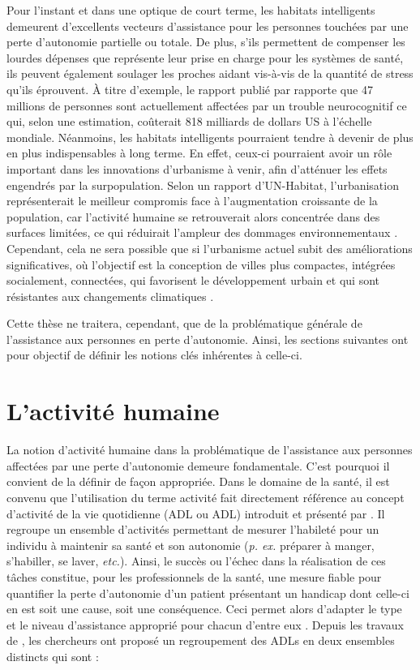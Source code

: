 Pour l’instant et dans une optique de court terme, les habitats intelligents demeurent d’excellents vecteurs d’assistance pour les personnes touchées par une perte d’autonomie partielle ou totale. De plus, s'ils permettent de compenser les lourdes dépenses que représente leur prise en charge pour les systèmes de santé, ils peuvent également soulager les proches aidant vis-à-vis de la quantité de stress qu’ils éprouvent. À titre d'exemple, le rapport publié par \cite{Prince2016} rapporte que 47 millions de personnes sont actuellement affectées par un trouble neurocognitif ce qui, selon une estimation, coûterait 818 milliards de dollars US à l'échelle mondiale. Néanmoins, les habitats intelligents pourraient tendre à devenir de plus en plus indispensables à long terme. En effet, ceux-ci pourraient avoir un rôle important dans les innovations d’urbanisme à venir, afin d’atténuer les effets engendrés par la surpopulation. Selon un rapport d’UN-Habitat, l’urbanisation représenterait le meilleur compromis face à l’augmentation croissante de la population, car l’activité humaine se retrouverait alors concentrée dans des surfaces limitées, ce qui réduirait l’ampleur des dommages environnementaux \citep{UNFPA2007}. Cependant, cela ne sera possible que si l’urbanisme actuel subit des améliorations significatives, où l’objectif est la conception de villes plus compactes, intégrées socialement, connectées, qui favorisent le développement urbain et qui sont résistantes aux changements climatiques \citep{UNFPA2007}.

Cette thèse ne traitera, cependant, que de la problématique générale de l'assistance aux personnes en perte d'autonomie. Ainsi, les sections suivantes ont pour objectif de définir les notions clés inhérentes à celle-ci.

\section{L'activité humaine}

La notion d'activité humaine dans la problématique de l'assistance aux personnes affectées par une perte d'autonomie demeure fondamentale. C'est pourquoi il convient de la définir de façon appropriée. Dans le domaine de la santé, il est convenu que l'utilisation du terme activité fait directement référence au concept d'activité de la vie quotidienne (\acl{ADL} ou \acs{ADL}) introduit et présenté par \cite{Katz1963}. Il regroupe un ensemble d'activités permettant de mesurer l'habileté pour un individu à maintenir sa santé et son autonomie (\textit{p. ex.} préparer à manger, s'habiller, se laver, \textit{etc.}). Ainsi, le succès ou l'échec dans la réalisation de ces tâches constitue, pour les professionnels de la santé, une mesure fiable pour quantifier la perte d'autonomie d'un patient présentant un handicap dont celle-ci en est soit une cause, soit une conséquence. Ceci permet alors d'adapter le type et le niveau d'assistance approprié pour chacun d'entre eux \citep{Giovannetti2002}. Depuis les travaux de \cite{Katz1963}, les chercheurs \cite{Lawton1969} ont proposé un regroupement des \acsp{ADL} en deux ensembles distincts qui sont :


